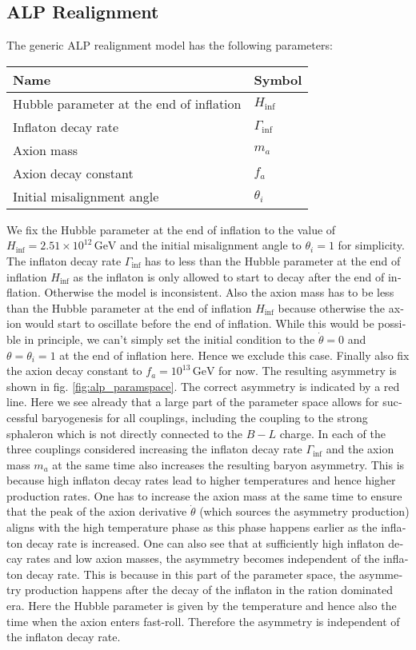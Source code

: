 \documentclass[master,       %
               twoside,        %
               BCOR10mm,       %
               english,ngerman, %
               ]{GAUBM}
\begin{document}
\begin{otherlanguage}{english}
\section{ALP Realignment}
The generic ALP realignment model has the following parameters:
\begin{table}[H]
	\begin{center}
		\begin{tabular}{ll}
			Name & Symbol \\
			\hline
			Hubble parameter at the end of inflation & $H_\mathrm{inf}$ \\
			Inflaton decay rate  & $\Gamma_\mathrm{inf}$ \\
			Axion mass & $m_a$ \\
			Axion decay constant & $f_a$ \\
			Initial misalignment angle & $\theta_i$ \\
		\end{tabular}
	\end{center}
\end{table}
We fix the Hubble parameter at the end of inflation to the value of $H_\mathrm{inf} = 2.51 \times 10^{12} \, \mathrm{GeV}$ and the initial misalignment angle to $\theta_i = 1$ for simplicity.
The inflaton decay rate $\Gamma_\mathrm{inf}$ has to less than the Hubble parameter at the end of inflation $H_\mathrm{inf}$ as the inflaton is only allowed to start to decay after the end of inflation. Otherwise the model is inconsistent. Also the axion mass has to be less than the Hubble parameter at the end of inflation $H_\mathrm{inf}$ because otherwise the axion would start to oscillate before the end of inflation. While this would be possible in principle, we can't simply set the initial condition to the $\dot{\theta} = 0$ and $\theta = \theta_i = 1$ at the end of inflation here. Hence we exclude this case.
Finally also fix the axion decay constant to $f_a = 10^{13} \, \mathrm{GeV}$ for now.
The resulting asymmetry is shown in fig. \ref{fig:alp_paramspace}. The correct asymmetry is indicated by a red line. Here we see already that a large part of the parameter space allows for successful baryogenesis for all couplings, including the coupling to the strong sphaleron which is not directly connected to the $B - L$ charge.
In each of the three couplings considered increasing the inflaton decay rate $\Gamma_\mathrm{inf}$ and the axion mass $m_a$ at the same time also increases the resulting baryon asymmetry. This is because high inflaton decay rates lead to higher temperatures and hence higher production rates. One has to increase the axion mass at the same time to ensure that the peak of the axion derivative $\dot{\theta}$ (which sources the asymmetry production) aligns with the high temperature phase as this phase happens earlier as the inflaton decay rate is increased. One can also see that at sufficiently high inflaton decay rates and low axion masses, the asymmetry becomes independent of the inflaton decay rate. This is because in this part of the parameter space, the asymmetry production happens after the decay of the inflaton in the ration dominated era. Here the Hubble parameter is given by the temperature and hence also the time when the axion enters fast-roll. Therefore the asymmetry is independent of the inflaton decay rate.

\end{otherlanguage}
\end{document}
